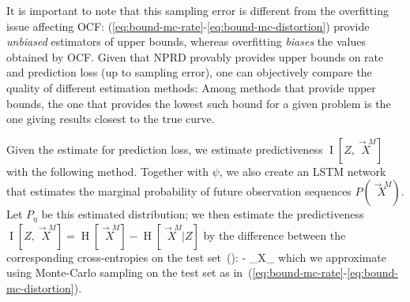 \documentclass[entropy,article,submit,moreauthors,pdftex,10pt,a4paper]{Definitions/mdpi}
\newcommand{\finitefuture}{\stackrel{\rightarrow \scriptscriptstyle{M}}{X}}
\newcommand{\finitepast}{\stackrel{\scriptscriptstyle{M}\leftarrow}{X}}%
\let\oldequation\equation
\let\oldendequation\endequation
\renewenvironment{equation}
  {\linenomathNonumbers\oldequation}
  {\oldendequation\endlinenomath}
\begin{document}

It is important to note that this sampling error is different from the overfitting issue affecting OCF: 
(\ref{eq:bound-mc-rate}-\ref{eq:bound-mc-distortion}) provide \emph{unbiased} estimators of upper bounds, whereas overfitting \emph{biases} the values obtained by OCF.
Given that NPRD provably provides upper bounds on rate and prediction loss (up to sampling error), one can objectively compare the quality of different estimation methods:
Among methods that provide upper bounds, the one that provides the lowest such bound for a given problem is the one giving results closest to the true curve.

Given the estimate for prediction loss, we estimate predictiveness $\operatorname{I}[Z, \finitefuture]$ with the following method.
Together with $\psi$, we also create an LSTM network that estimates the marginal probability of future observation sequences $P(\finitefuture)$. Let $P_\eta$ be this estimated distribution; we then estimate the predictiveness $\operatorname{I}[Z, \finitefuture] = \operatorname{H}[\finitefuture] - \operatorname{H}[\finitefuture|Z]$ by the difference between the corresponding cross-entropies on the test set~(\cite{mcallester2018formal}):
\begin{equation}\label{eq:bound-mc-predictiveness}
- _{X_{\finitepast\finitefuture}}\left[\log P_\eta(\finitefuture) - P_\psi(\finitefuture | Z)\right]
\end{equation}
which we approximate using Monte-Carlo sampling on the test set as in~(\ref{eq:bound-mc-rate}-\ref{eq:bound-mc-distortion}).





\end{document}
